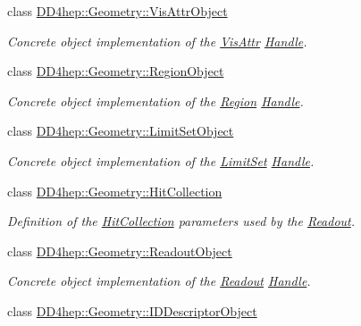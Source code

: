 \begin{DoxyCompactItemize}
class \hyperlink{class_d_d4hep_1_1_geometry_1_1_vis_attr_object}{DD4hep::Geometry::VisAttrObject}
\begin{DoxyCompactList}\small\item\em Concrete object implementation of the \hyperlink{class_d_d4hep_1_1_geometry_1_1_vis_attr}{VisAttr} \hyperlink{class_d_d4hep_1_1_handle}{Handle}. \item\end{DoxyCompactList}\item 
class \hyperlink{class_d_d4hep_1_1_geometry_1_1_region_object}{DD4hep::Geometry::RegionObject}
\begin{DoxyCompactList}\small\item\em Concrete object implementation of the \hyperlink{class_d_d4hep_1_1_geometry_1_1_region}{Region} \hyperlink{class_d_d4hep_1_1_handle}{Handle}. \item\end{DoxyCompactList}\item 
class \hyperlink{class_d_d4hep_1_1_geometry_1_1_limit_set_object}{DD4hep::Geometry::LimitSetObject}
\begin{DoxyCompactList}\small\item\em Concrete object implementation of the \hyperlink{class_d_d4hep_1_1_geometry_1_1_limit_set}{LimitSet} \hyperlink{class_d_d4hep_1_1_handle}{Handle}. \item\end{DoxyCompactList}\item 
class \hyperlink{class_d_d4hep_1_1_geometry_1_1_hit_collection}{DD4hep::Geometry::HitCollection}
\begin{DoxyCompactList}\small\item\em Definition of the \hyperlink{class_d_d4hep_1_1_geometry_1_1_hit_collection}{HitCollection} parameters used by the \hyperlink{class_d_d4hep_1_1_geometry_1_1_readout}{Readout}. \item\end{DoxyCompactList}\item 
class \hyperlink{class_d_d4hep_1_1_geometry_1_1_readout_object}{DD4hep::Geometry::ReadoutObject}
\begin{DoxyCompactList}\small\item\em Concrete object implementation of the \hyperlink{class_d_d4hep_1_1_geometry_1_1_readout}{Readout} \hyperlink{class_d_d4hep_1_1_handle}{Handle}. \item\end{DoxyCompactList}\item 
class \hyperlink{class_d_d4hep_1_1_geometry_1_1_i_d_descriptor_object}{DD4hep::Geometry::IDDescriptorObject}

\end{DoxyCompactItemize}
